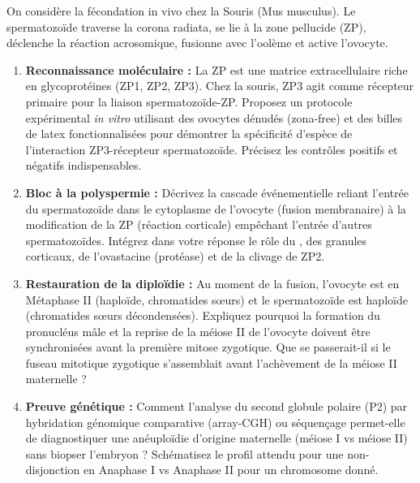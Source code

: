 \documentclass[11pt]{article}
\begin{document}
\begin{exercice}
On considère la fécondation in vivo chez la Souris (Mus musculus). Le spermatozoïde traverse la corona radiata, se lie à la zone pellucide (ZP), déclenche la réaction acrosomique, fusionne avec l'oolème et active l'ovocyte.
\begin{enumerate}
    \item \textbf{Reconnaissance moléculaire :} La ZP est une matrice extracellulaire riche en glycoprotéines (ZP1, ZP2, ZP3). Chez la souris, ZP3 agit comme récepteur primaire pour la liaison spermatozoïde-ZP. Proposez un protocole expérimental \textit{in vitro} utilisant des ovocytes dénudés (zona-free) et des billes de latex fonctionnalisées pour démontrer la spécificité d'espèce de l'interaction ZP3-récepteur spermatozoïde. Précisez les contrôles positifs et négatifs indispensables.
    \item \textbf{Bloc à la polyspermie :} Décrivez la cascade événementielle reliant l'entrée du spermatozoïde dans le cytoplasme de l'ovocyte (fusion membranaire) à la modification de la ZP (réaction corticale) empêchant l'entrée d'autres spermatozoïdes. Intégrez dans votre réponse le rôle du , des granules corticaux, de l'ovastacine (protéase) et de la clivage de ZP2.
    \item \textbf{Restauration de la diploïdie :} Au moment de la fusion, l'ovocyte est en Métaphase II (haploïde, chromatides sœurs) et le spermatozoïde est haploïde (chromatides sœurs décondensées). Expliquez pourquoi la formation du pronucléus mâle et la reprise de la méiose II de l'ovocyte doivent être synchronisées avant la première mitose zygotique. Que se passerait-il si le fuseau mitotique zygotique s'assemblait avant l'achèvement de la méiose II maternelle ?
    \item \textbf{Preuve génétique :} Comment l'analyse du second globule polaire (P2) par hybridation génomique comparative (array-CGH) ou séquençage permet-elle de diagnostiquer une anéuploïdie d'origine maternelle (méiose I vs méiose II) sans biopser l'embryon ? Schématisez le profil attendu pour une non-disjonction en Anaphase I vs Anaphase II pour un chromosome donné.
\end{enumerate}
\end{exercice}
\end{document}
